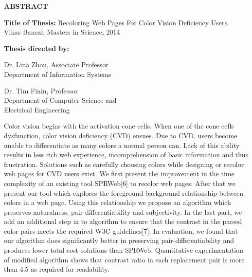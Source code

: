 \newpage
\pagestyle{empty}

\begin{center}
\vspace{0.1in}
\large{\bf ABSTRACT} \par  
\bigskip \bigskip
\end{center}

\begin{flushleft}
{\bf Title of Thesis:} Recoloring Web Pages For Color Vision Deficiency Users.\\
Vikas Bansal, Masters in Science, 2014 \\
\begin{singlespace}
{\bf Thesis directed by:}{\hspace{2.5mm}} \parbox[t]{3in}{Dr. Lina Zhou, Associate Professor\\
Department of Information Systems}
\end{singlespace}
\begin{singlespace}
{\hspace{37.9mm}}\parbox[t]{3in}{Dr. Tim Finin, Professor\\
Department of Computer Science and \\ Electrical Engineering}
\end{singlespace}
\end{flushleft}

Color vision begins with the activation cone cells. When one of the cone cells dysfunction, color vision deficiency (CVD) ensues. Due to CVD, users become unable to differentiate as many colors a normal person can. Lack of this ability results in less rich web experience, incomprehension of basic information and thus frustration. Solutions such as carefully choosing colors while designing or recolor web pages for CVD users exist. We first present the improvement in the time complexity of an existing tool SPRWeb[6] to recolor web pages. After that we present our tool which explores the foreground-background relationship between colors in a web page. Using this relationship we propose an algorithm which preserves naturalness, pair-differentiability and subjectivity. In the last part, we add an additional step in to algorithm to ensure that the contrast in the parsed  color pairs meets the required W3C guidelines[7]. In evaluation, we found that our algorithm does significantly better in preserving pair-differentiability and produces lower total cost solutions than SPRWeb. Quantitative experimentation of modified algorithm shows that contrast ratio in each replacement pair is more than 4.5 as required for readability.

\par\vfil

